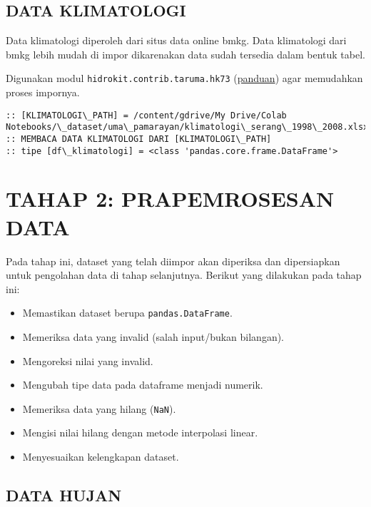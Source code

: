 \documentclass[11pt]{article}
\providecommand{\tightlist}{%
      \setlength{\itemsep}{0pt}\setlength{\parskip}{0pt}}
\let\oldsection\section
\renewcommand\section{\clearpage\oldsection}
\begin{document}
    \hypertarget{data-klimatologi}{%
\subsection{DATA KLIMATOLOGI}\label{data-klimatologi}}

Data klimatologi diperoleh dari situs data online bmkg. Data klimatologi
dari bmkg lebih mudah di impor dikarenakan data sudah tersedia dalam
bentuk tabel.

Digunakan modul \texttt{hidrokit.contrib.taruma.hk73}
(\href{https://nbviewer.jupyter.org/gist/taruma/b00880905f297013f046dad95dc2e284}{panduan})
agar memudahkan proses impornya.

    \begin{Verbatim}[commandchars=\\\{\}]
:: [KLIMATOLOGI\_PATH] = /content/gdrive/My Drive/Colab
Notebooks/\_dataset/uma\_pamarayan/klimatologi\_serang\_1998\_2008.xlsx
:: MEMBACA DATA KLIMATOLOGI DARI [KLIMATOLOGI\_PATH]
:: tipe [df\_klimatologi] = <class 'pandas.core.frame.DataFrame'>
    \end{Verbatim}

    \hypertarget{tahap-2-prapemrosesan-data}{%
\section{TAHAP 2: PRAPEMROSESAN DATA}\label{tahap-2-prapemrosesan-data}}

Pada tahap ini, dataset yang telah diimpor akan diperiksa dan
dipersiapkan untuk pengolahan data di tahap selanjutnya. Berikut yang
dilakukan pada tahap ini:

\begin{itemize}
\tightlist
\item
  Memastikan dataset berupa \texttt{pandas.DataFrame}.
\item
  Memeriksa data yang invalid (salah input/bukan bilangan).
\item
  Mengoreksi nilai yang invalid.
\item
  Mengubah tipe data pada dataframe menjadi numerik.
\item
  Memeriksa data yang hilang (\texttt{NaN}).
\item
  Mengisi nilai hilang dengan metode interpolasi linear.
\item
  Menyesuaikan kelengkapan dataset.
\end{itemize}

    \hypertarget{data-hujan}{%
\subsection{DATA HUJAN}\label{data-hujan}}
\end{document}
